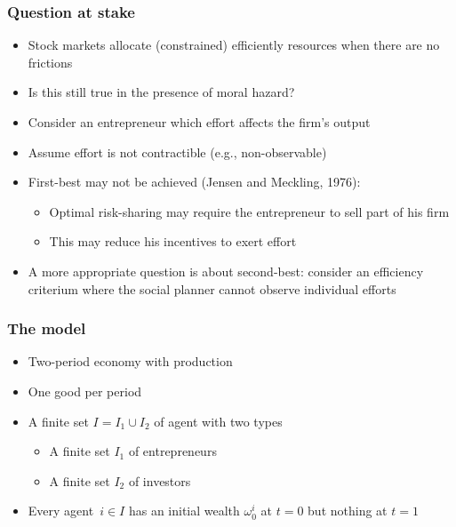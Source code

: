 \documentclass[blue]{beamer}
\theoremstyle{definition}
\theoremstyle{example}
\begin{document}

\begin{frame}\frametitle{Question at stake}

\begin{itemize}
\item Stock markets allocate (constrained) efficiently resources when there are no frictions
\item Is this still true in the presence of moral hazard?
\item Consider an entrepreneur which effort affects the firm's output
\item Assume effort is not contractible (e.g., non-observable)
\item First-best may not be achieved (Jensen and Meckling, 1976):
    \begin{itemize}
    \item Optimal risk-sharing may require the entrepreneur to sell part of his firm
    \item This may reduce his incentives to exert effort
    \end{itemize}
\item A more appropriate question is about second-best: consider an efficiency criterium where the social planner cannot observe individual efforts
\end{itemize}

\end{frame}


\begin{frame}\frametitle{The model}

\begin{itemize}
\item Two-period economy with production
\item One good per period
\item A finite set $I= I_1 \cup I_2$ of agent with two types
    \begin{itemize}
    \item A finite set $I_1$ of entrepreneurs
    \item A finite set $I_2$ of investors
    \end{itemize}
\item Every agent~$i\in I$ has an initial wealth $\omega^i_0$ at $t=0$ but nothing at $t=1$
\end{itemize}

\end{frame}
\end{document}
